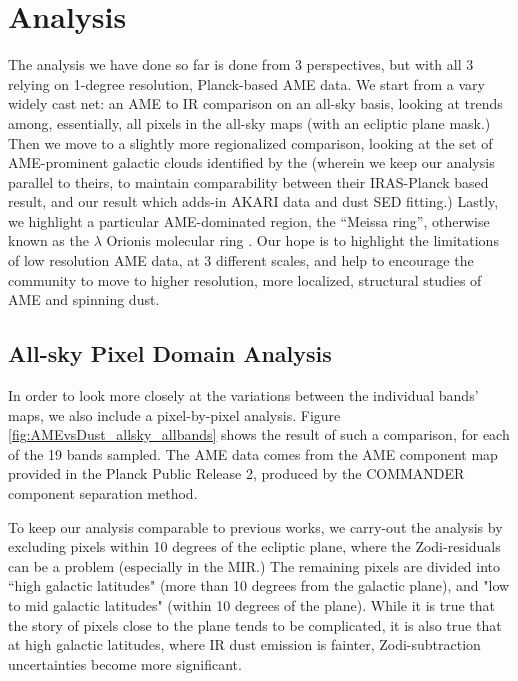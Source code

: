 \documentclass[preprint2,longabstract]{aastex}
\begin{document}
     
\section{Analysis}

The analysis we have done so far is done from 3 perspectives, but with all 3 relying on 1-degree resolution, Planck-based AME data. We start from a vary widely cast net: an AME to IR comparison on an all-sky basis, looking at trends among, essentially, all pixels in the all-sky maps (with an ecliptic plane mask.) Then we move to a slightly more regionalized comparison, looking at the set of AME-prominent galactic clouds identified by the \cite{planckXV} (wherein we keep our analysis parallel to theirs, to maintain comparability between their IRAS-Planck based result, and our result which adds-in AKARI data and dust SED fitting.) Lastly, we highlight a particular AME-dominated region, the ``Meissa ring'', otherwise known as the $\lambda$ Orionis molecular ring \citep{maddalena86,maddalena87}. Our hope is to highlight the limitations of low resolution AME data, at 3 different scales, and help to encourage the community to move to higher resolution, more localized, structural studies of AME and spinning dust. 

\subsection{All-sky Pixel Domain Analysis}

	In order to look more closely at the variations between the individual bands' maps, we also include a pixel-by-pixel analysis. Figure \ref{fig:AMEvsDust_allsky_allbands} shows the result of such a comparison, for each of the 19 bands sampled. The AME data comes from the AME component map provided in the Planck Public Release 2, produced by the COMMANDER component separation method. 
    
    To keep our analysis comparable to previous works, we carry-out the analysis by excluding pixels within 10 degrees of the ecliptic plane, where the Zodi-residuals can be a problem (especially in the MIR.) The remaining pixels are divided into ``high galactic latitudes" (more than 10 degrees from the galactic plane), and "low to mid galactic latitudes" (within 10 degrees of the plane).  While it is true that the story of pixels close to the plane tends to be complicated, it is also true that at high galactic latitudes, where IR dust emission is fainter, Zodi-subtraction uncertainties become more significant.  
    
\end{document}
